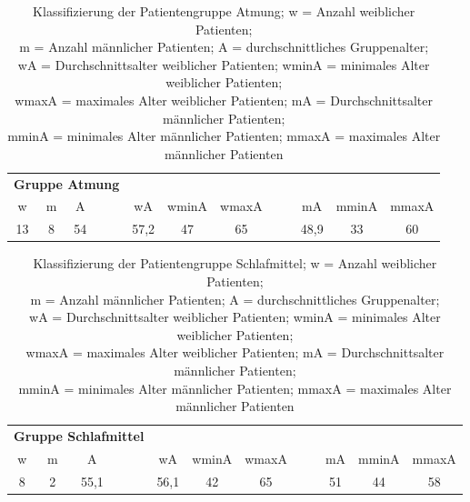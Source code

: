 \begin{table}[H] 
\centering
\begin{tabularx}{0.9\textwidth}{ccccccccccc}
\toprule
\multicolumn{4}{c}{\textbf{Gruppe Atmung}} & & & & & & &\\  
\cmidrule{1-4}
w  & m & A  &    & wA   & wminA & wmaxA &    & mA   & mminA & mmaxA\\
\midrule
13 & 8 & 54 & ~~ & 57,2 & 47    & 65    & ~~ & 48,9 & 33    & 60\\
\bottomrule
\end{tabularx}
\caption[Gruppe Atmung]{Klassifizierung der Patientengruppe Atmung; w = Anzahl weiblicher Patienten;\\m = Anzahl männlicher Patienten; A = durchschnittliches Gruppenalter;\\wA = Durchschnittsalter weiblicher Patienten; wminA = minimales Alter weiblicher Patienten;\\wmaxA = maximales Alter weiblicher Patienten; mA = Durchschnittsalter männlicher Patienten;\\mminA = minimales Alter männlicher Patienten; mmaxA = maximales Alter männlicher Patienten}
\label{tab:Atmung}
\end{table}


\begin{table}[H] 
\centering
\begin{tabularx}{0.95\textwidth}{ccccccccccc}
\toprule
\multicolumn{4}{c}{\textbf{Gruppe Schlafmittel}} & & & & & & &\\  
\cmidrule{1-4}
w & m & A    &    & wA   & wminA & wmaxA &    & mA  & mminA & mmaxA\\
\midrule
8 & 2 & 55,1 & ~~ & 56,1 & 42    & 65    & ~~ & 51 & 44     & 58\\
\bottomrule
\end{tabularx}
\caption[Gruppe Schlafmittel]{Klassifizierung der Patientengruppe Schlafmittel; w = Anzahl weiblicher Patienten;\\m = Anzahl männlicher Patienten; A = durchschnittliches Gruppenalter;\\wA = Durchschnittsalter weiblicher Patienten; wminA = minimales Alter weiblicher Patienten;\\wmaxA = maximales Alter weiblicher Patienten; mA = Durchschnittsalter männlicher Patienten;\\mminA = minimales Alter männlicher Patienten; mmaxA = maximales Alter männlicher Patienten}
\label{tab:Schlafmittel}
\end{table}


